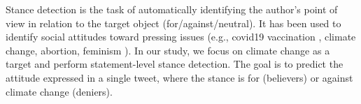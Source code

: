 \documentclass[letterpaper]{article} %
\begin{document}
\par \noindent Stance detection is the task of automatically identifying the author's point of view in relation to the target object (for/against/neutral). It has been used to identify social attitudes toward pressing issues (e.g., covid19 vaccination \cite{argyris2021using}, climate change, abortion, feminism \cite{mohammad2016semeval}). In our study, we focus on climate change as a target and perform statement-level stance detection. The goal is to predict the attitude expressed in a single tweet, where the stance is for (believers) or against climate change (deniers). %
\end{document}
